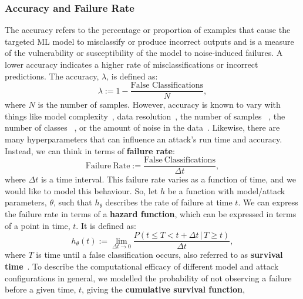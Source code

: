 \subsubsection{Accuracy and Failure Rate}
The accuracy refers to the percentage or proportion of examples that cause the targeted ML model to misclassify or produce incorrect outputs and is a measure of the vulnerability or susceptibility of the model to noise-induced failures. A lower accuracy indicates a higher rate of misclassifications or incorrect predictions. The accuracy, $\lambda$, is defined as:
\begin{equation}
    \lambda := 1 -  \frac{\textrm{False~Classifications}}{N},
    \label{eq:acc}
\end{equation}
where $N$ is the number of samples.
However, accuracy is known to vary with things like model complexity~\cite{vgg,resnet}, data resolution~\cite{feature_squeezing}, the number of samples~\cite{vapnik1994measuring} , the number of classes ~\cite{dohmatob_generalized_2019}, or the amount of noise in the data~\cite{gauss_aug,gauss_out,dohmatob_generalized_2019}. Likewise, there are many hyperparameters that can influence an attack's run time and accuracy. Instead, we can think in terms of \textbf{failure rate}:
\begin{equation}
    \mathrm{Failure~Rate} := \frac{\mathrm{False~Classifications}}{\Delta t},
    \label{eq:failure_rate}
\end{equation}
where $\Delta t$ is a time interval. This failure rate varies as a function of time, and we would like to model this behaviour.
So, let $h$ be a function with model/attack parameters, $\theta$, such that $h_{\theta}$ describes the rate of failure at time $t$.
We can express the failure rate in terms of a \textbf{hazard function}, which can be expressed in terms of a point in time, $t$. It is defined as:
\begin{equation}
    h_{\theta}(t) := \lim_{ \Delta t \rightarrow 0} \frac{P(t \leq T < t + \Delta t \,|\, T \geq t)}{\Delta t},
    \label{eq:failure_rate_h}
\end{equation}
where $T$ is time until a false classification occurs, also referred to as \textbf{survival time}~\cite{kleinbaum1996survival}. To describe the computational efficacy of different model and attack configurations in general, we modelled the
probability of not observing a failure before a given time, $t$, giving the \textbf{cumulative survival function},
